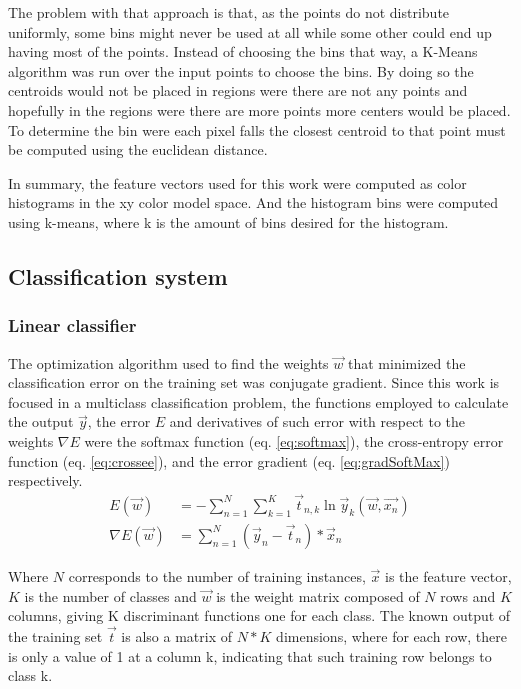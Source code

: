 \documentclass{IEEEtran}
\begin{document}
The problem with that approach is that, as the points do not distribute uniformly, some bins might
never be used at all while some other could end up having most of the points. Instead of choosing the
bins that way, a K-Means algorithm was run over the input points to choose the bins. By doing so
the centroids would not be placed in regions were there are not any points and hopefully in the
regions were there are more points more centers would be placed. To determine the bin were each pixel
falls the closest centroid to that point must be computed using the euclidean distance.

In summary, the feature vectors used for this work were computed as color histograms in the
xy color model space. And the histogram bins were computed using k-means, where k is the
amount of bins desired for the histogram.


\subsection{Classification system}

\subsubsection{Linear classifier}
The optimization algorithm used to find the weights $\vec{w}$ that minimized the classification error on the training 
set was conjugate gradient.
Since this work is focused in a multiclass classification problem, the functions employed to calculate the output $\vec{y}$, the error $E$
and derivatives of such error with respect to the weights $\nabla E$ were the softmax function (eq. \ref{eq:softmax}), 
the cross-entropy error function (eq. \ref{eq:crossee}), and the error gradient (eq. \ref{eq:gradSoftMax}) respectively.
\begin{align}
E(\vec{w}) &= -\sum_{n=1}^{N}{\sum_{k=1}^{K}{\vec{t}_{n,k} \ln \vec{y}_{k}(\vec{w},\vec{x_{n}})}} \label{eq:crossee} \\
\nabla E(\vec{w}) &=  \sum_{n=1}^{N}{(\vec{y}_{n} - \vec{t}_{n})*\vec{x}_{n}} \label{eq:gradSoftMax}
\end{align}

Where $N$ corresponds to the number of training instances, $\vec{x}$ is the feature vector, $K$ is the number of classes
and $\vec{w}$ is the weight matrix composed of $N$ rows and $K$ columns, giving K discriminant functions one for
each class. The known output of the training set $\vec{t}$ is also a matrix of $N * K$ dimensions, where for each row, 
there is only a value of 1 at a column k, indicating that such training row belongs to class k.
\end{document}
